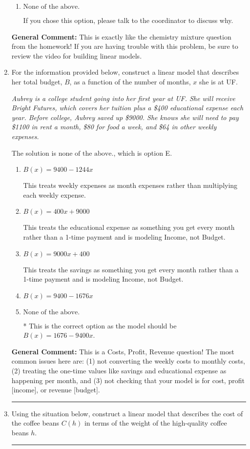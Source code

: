 \documentclass{extbook}[14pt]
\newcommand{\litem}[1]{\item #1

\rule{\textwidth}{0.4pt}}
\begin{document}
\begin{enumerate}
{\begin{enumerate}[label=\Alph*.]
This models the cost of the low-quality bean only, not the blended beans.
\item \( \text{None of the above.} \)

If you chose this option, please talk to the coordinator to discuss why.
\end{enumerate}

\textbf{General Comment:} This is exactly like the chemistry mixture question from the homework! If you are having trouble with this problem, be sure to review the video for building linear models.
}
\litem{
For the information provided below, construct a linear model that describes her total budget, $B$, as a function of the number of months, $x$ she is at UF.

\begin{center}
    \textit{ Aubrey is a college student going into her first year at UF. She will receive Bright Futures, which covers her tuition plus a \$400 educational expense each year. Before college, Aubrey saved up \$9000. She knows she will need to pay \$1100 in rent a month, \$80 for food a week, and \$64 in other weekly expenses. }
\end{center}
The solution is \( \text{none of the above.} \), which is option E.\begin{enumerate}[label=\Alph*.]
\item \( B(x) = 9400 - 1244 x \)

This treats weekly expenses as month expenses rather than multiplying each weekly expense.
\item \( B(x) = 400 x + 9000 \)

This treats the educational expense as something you get every month rather than a 1-time payment and is modeling Income, not Budget.
\item \( B(x) = 9000 x + 400 \)

This treats the savings as something you get every month rather than a 1-time payment and is modeling Income, not Budget.
\item \( B(x) = 9400 - 1676 x \)


\item \( \text{None of the above.} \)

* This is the correct option as the model should be $B(x) = 1676 - 9400 x$.
\end{enumerate}

\textbf{General Comment:} This is a Costs, Profit, Revenue question! The most common issues here are: (1) not converting the weekly costs to monthly costs, (2) treating the one-time values like savings and educational expense as happening per month, and (3) not checking that your model is for cost, profit [income], or revenue [budget].
}
\litem{
Using the situation below, construct a linear model that describes the cost of the coffee beans $C(h)$ in terms of the weight of the high-quality coffee beans $h$.

}
\end{enumerate}
\end{document}
